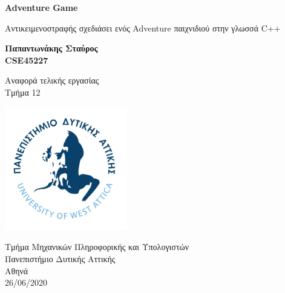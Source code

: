 %
%
%
\begin{titlepage}
	\begin{center}
		\vspace{1cm}	
		\Huge	
		\textbf{Adventure Game}
		
		\vspace{0.5cm}
		\large
		Αντικειμενοστραφής σχεδιάσει ενός Adventure παιχνιδιού στην γλωσσά C++
				
		\vspace{1.5cm}
		\textbf{Παπαντωνάκης Σταύρος\\ CSE45227}
		\vfill
		
		Αναφορά τελικής εργασίας \\
		Τμήμα 12
		\vspace{0.8cm}
		\begin{center}
			\includegraphics[width=0.4\textwidth]{image/logo.jpg}		
		\end{center}
		\normalsize
		Τμήμα Μηχανικών Πληροφορικής και Υπολογιστών\\
		Πανεπιστήμιο Δυτικής Αττικής\\
		Αθηνά\\
		26/06/2020\\	
	\end{center}
\end{titlepage}